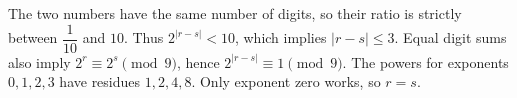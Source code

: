 The two numbers have the same number of digits, so their ratio is strictly between $\dfrac{1}{10}$ and $10$. Thus $2^{|r-s|}<10$, which implies $|r-s|\le3$. Equal digit sums also imply $2^r\equiv2^s\pmod9$, hence $2^{|r-s|}\equiv1\pmod9$. The powers for exponents $0,1,2,3$ have residues $1,2,4,8$. Only exponent zero works, so $r=s$.

